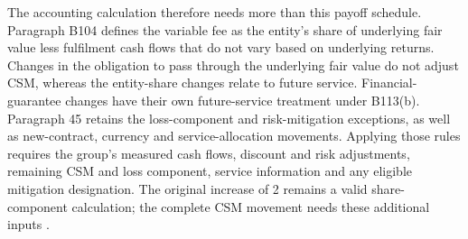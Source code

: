 The accounting calculation therefore needs more than this payoff schedule.
Paragraph B104 defines the variable fee as the entity's share of underlying
fair value less fulfilment cash flows that do not vary based on underlying
returns. Changes in the obligation to pass through the underlying fair value
do not adjust CSM, whereas the entity-share changes relate to future service.
Financial-guarantee changes have their own future-service treatment under
B113(b). Paragraph 45 retains the loss-component and risk-mitigation exceptions,
as well as new-contract, currency and service-allocation movements. Applying
those rules requires the group's measured cash flows, discount and risk
adjustments, remaining CSM and loss component, service information and any
eligible mitigation designation. The original increase of 2 remains a valid
share-component calculation; the complete CSM movement needs these additional
inputs \citep[paragraphs 32--38, 45, 48--50 and B104--B118]{aasb17}.
